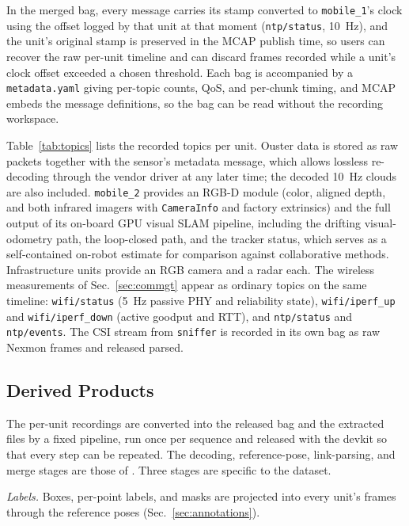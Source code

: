 \documentclass[journal]{IEEEtran}
\begin{document}
In the merged bag, every message carries its stamp converted to
\texttt{mobile\_1}'s clock using the offset logged by that unit at
that moment (\texttt{ntp/status}, \SI{10}{\hertz}), and the unit's
original stamp is preserved in the MCAP publish time, so users can
recover the raw per-unit timeline and can discard frames recorded
while a unit's clock offset exceeded a chosen threshold. Each bag is
accompanied by a \texttt{metadata.yaml} giving per-topic counts, QoS,
and per-chunk timing, and MCAP embeds the message definitions, so the
bag can be read without the recording workspace.

Table~\ref{tab:topics} lists the recorded topics per unit. Ouster
data is stored as raw packets together with the sensor's metadata
message, which allows lossless re-decoding through the vendor driver
at any later time; the decoded \SI{10}{\hertz} clouds are also
included. \texttt{mobile\_2} provides an RGB-D module (color, aligned
depth, and both infrared imagers with \texttt{CameraInfo} and factory
extrinsics) and the full output of its on-board GPU visual SLAM
pipeline, including the drifting visual-odometry path, the
loop-closed path, and the tracker status, which serves as a
self-contained on-robot estimate for comparison against
collaborative methods. Infrastructure units provide an RGB camera and
a radar each. The wireless measurements of Sec.~\ref{sec:commgt}
appear as ordinary topics on the same timeline: \texttt{wifi/status}
(\SI{5}{\hertz} passive PHY and reliability state),
\texttt{wifi/iperf\_up} and \texttt{wifi/iperf\_down} (active
goodput and RTT), and \texttt{ntp/status} and \texttt{ntp/events}.
The CSI stream from \texttt{sniffer} is recorded in its own bag as raw
Nexmon frames and released parsed.



\subsection{Derived Products}
\label{sec:postproc}
The per-unit recordings are converted into the released bag and the
extracted files by a fixed pipeline, run once per sequence and
released with the devkit so that every step can be repeated. The
decoding, reference-pose, link-parsing, and merge stages are those of
\cite{scoop_testbed}. Three stages are specific to the dataset.

\emph{Labels.} Boxes, per-point labels, and masks are projected into
every unit's frames through the reference poses
(Sec.~\ref{sec:annotations}).
\end{document}
